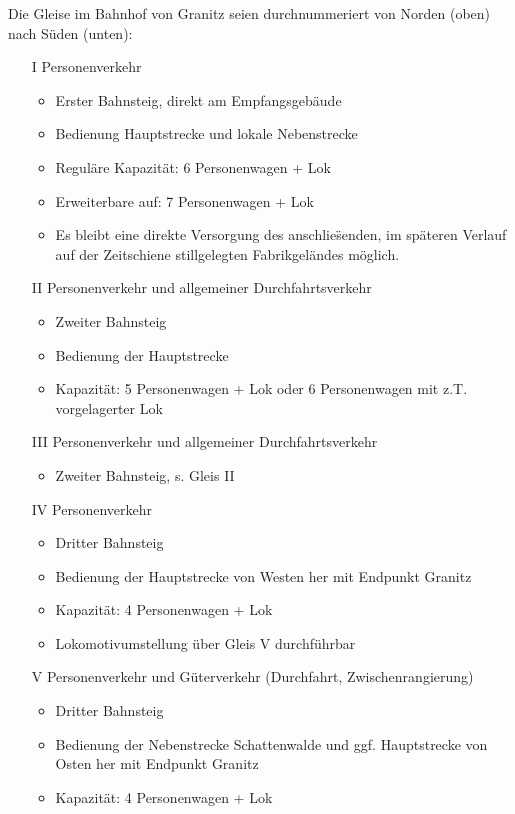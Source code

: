 Die Gleise im Bahnhof von Granitz seien durchnummeriert von Norden (oben) nach S\"uden (unten):
\begin{itemize}
	\item[I] Personenverkehr
	\begin{itemize}
		\item Erster Bahnsteig, direkt am Empfangsgeb\"aude
		\item Bedienung Hauptstrecke und lokale Nebenstrecke
		\item Regul\"are Kapazit\"at: 6 Personenwagen + Lok
		\item Erweiterbare auf: 7 Personenwagen + Lok
		\item Es bleibt eine direkte Versorgung des anschlie\"senden, im sp\"ateren Verlauf auf der Zeitschiene stillgelegten Fabrikgel\"andes m\"oglich.
	\end{itemize}
	\item[II] Personenverkehr und allgemeiner Durchfahrtsverkehr
	\begin{itemize}
		\item Zweiter Bahnsteig
		\item Bedienung der Hauptstrecke
		\item Kapazit\"at: 5 Personenwagen + Lok oder 6 Personenwagen mit z.T. vorgelagerter Lok
	\end{itemize}
	\item[III] Personenverkehr und allgemeiner Durchfahrtsverkehr
	\begin{itemize}
		\item Zweiter Bahnsteig, s. Gleis II
	\end{itemize}
	\item[IV] Personenverkehr
	\begin{itemize}
		\item Dritter Bahnsteig
		\item Bedienung der Hauptstrecke von Westen her mit Endpunkt Granitz
		\item Kapazit\"at: 4 Personenwagen + Lok
		\item Lokomotivumstellung \"uber Gleis V durchf\"uhrbar
	\end{itemize}
	\item[V] Personenverkehr und G\"uterverkehr (Durchfahrt, Zwischenrangierung)
	\begin{itemize}
		\item Dritter Bahnsteig
		\item Bedienung der Nebenstrecke Schattenwalde und ggf. Hauptstrecke von Osten her mit Endpunkt Granitz
		\item Kapazit\"at: 4 Personenwagen + Lok

\end{itemize}
\end{itemize}
